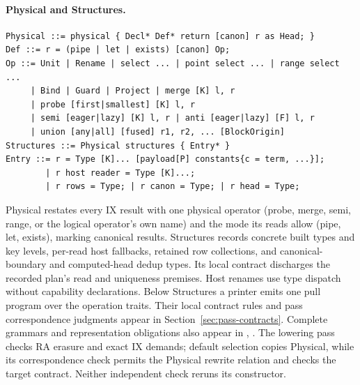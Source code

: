 \paragraph{Physical and Structures.}
\begin{lstlisting}
Physical ::= physical { Decl* Def* return [canon] r as Head; }
Def ::= r = (pipe | let | exists) [canon] Op;
Op ::= Unit | Rename | select ... | point select ... | range select ...
     | Bind | Guard | Project | merge [K] l, r
     | probe [first|smallest] [K] l, r
     | semi [eager|lazy] [K] l, r | anti [eager|lazy] [F] l, r
     | union [any|all] [fused] r1, r2, ... [BlockOrigin]
Structures ::= Physical structures { Entry* }
Entry ::= r = Type [K]... [payload[P] constants{c = term, ...}];
        | r host reader = Type [K]...;
        | r rows = Type; | r canon = Type; | r head = Type;
\end{lstlisting}

Physical restates every IX result with one physical operator (probe, merge,
semi, range, or the logical operator's own name) and the mode its reads allow
(pipe, let, exists), marking canonical results. Structures records concrete
built types and key levels, per-read host fallbacks, retained row collections,
and canonical-boundary and computed-head dedup types. Its local contract
discharges the recorded plan's read and uniqueness premises.
Host renames use type dispatch without capability declarations. Below Structures a printer emits one pull program
over the  operation traits. Their local contract rules and
pass correspondence judgments appear in Section~\ref{sec:pass-contracts}.
Complete grammars and representation obligations also appear in ,
. The lowering pass checks RA
erasure and exact IX demands; default selection copies Physical, while its
correspondence check permits the Physical rewrite relation and checks the
target contract. Neither independent check reruns its constructor.

